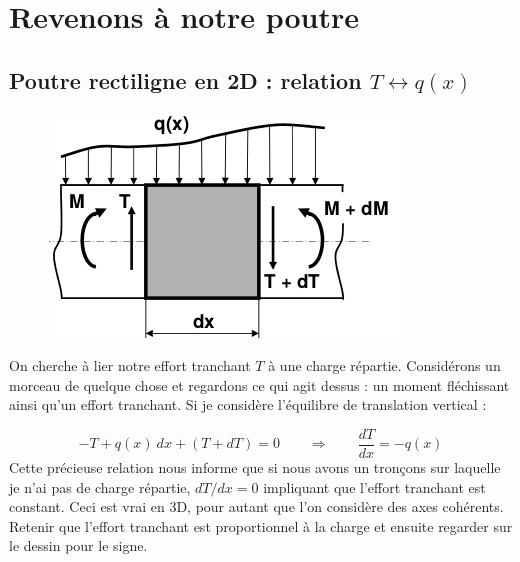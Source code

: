 	\newpage
	
\section{Revenons à notre poutre}
	\subsection{Poutre rectiligne en 2D : relation $T \leftrightarrow 
	q(x)$}
	\begin{figure}
	\vspace{-5mm}
	\includegraphics[scale=0.35]{ch2/image11.png}
	\end{figure}
	On cherche à lier notre effort tranchant $T$ à une charge 
	répartie. Considérons un morceau de quelque chose et regardons ce 
	qui agit dessus : un moment fléchissant ainsi qu'un effort 
	tranchant. Si je considère l'équilibre de translation vertical :

	\begin{equation}
	-T + q(x)\ dx + (T+dT) = 0\qquad\Longrightarrow \qquad \dfrac{dT}{dx}
	=-q(x)
	\end{equation}
	Cette précieuse relation nous informe que si nous avons un tronçons 
	sur laquelle je n'ai pas de charge répartie, $dT/dx = 0$ impliquant 
	que l'effort tranchant est constant. Ceci est vrai en 3D, pour autant 
	que l'on considère des axes cohérents.\\
	\danger Retenir que l'effort tranchant est proportionnel à la charge 
	et ensuite regarder sur le dessin pour le signe.
